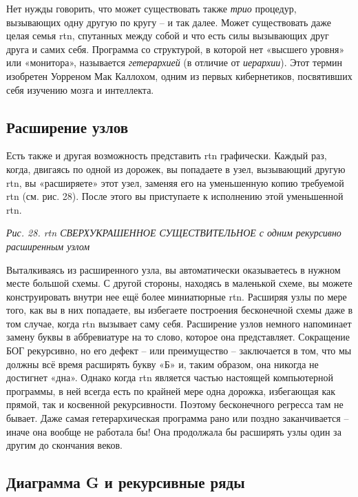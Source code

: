 \documentclass[../main.tex]{subfiles}
\begin{document}
Нет нужды говорить, что может существовать также \emph{трио} процедур, вызывающих одну другую по кругу \--- и так далее. Может существовать даже целая семья \acs{rtn}, спутанных между собой и что есть силы вызывающих друг друга и самих себя. Программа со структурой, в которой нет «высшего уровня» или «монитора», называется \emph{гетерархией} (в отличие от \emph{иерархии}). Этот термин изобретен Уорреном Мак Каллохом, одним из первых кибернетиков, посвятивших себя изучению мозга и интеллекта.


\subsection{Расширение узлов}

Есть также и другая возможность представить \acs{rtn} графически. Каждый раз, когда, двигаясь по одной из дорожек, вы попадаете в узел, вызывающий другую \acs{rtn}, вы «расширяете» этот узел, заменяя его на уменьшенную копию требуемой \acs{rtn} (см. рис. 28). После этого вы приступаете к исполнению этой уменьшенной \acs{rtn}\@.

\emph{Рис. 28. \Acs{rtn} СВЕРХУКРАШЕННОЕ СУЩЕСТВИТЕЛЬНОЕ с одним рекурсивно расширенным узлом}

Выталкиваясь из расширенного узла, вы автоматически оказываетесь в нужном месте большой схемы. С другой стороны, находясь в маленькой схеме, вы можете конструировать внутри нее ещё более миниатюрные \acs{rtn}\@. Расширяя узлы по мере того, как вы в них попадаете, вы избегаете построения бесконечной схемы даже в том случае, когда \acs{rtn} вызывает саму себя. Расширение узлов немного напоминает замену буквы в аббревиатуре на то слово, которое она представляет. Сокращение БОГ рекурсивно, но его дефект \--- или преимущество \--- заключается в том, что мы должны всё время расширять букву «Б» и, таким образом, она никогда не достигнет «дна». Однако когда \acs{rtn} является частью настоящей компьютерной программы, в ней всегда есть по крайней мере одна дорожка, избегающая как прямой, так и косвенной рекурсивности. Поэтому бесконечного регресса там не бывает. Даже самая гетерархическая программа рано или поздно заканчивается \--- иначе она вообще не работала бы! Она продолжала бы расширять узлы один за другим до скончания веков.


\subsection{Диаграмма G и рекурсивные ряды}
\end{document}
